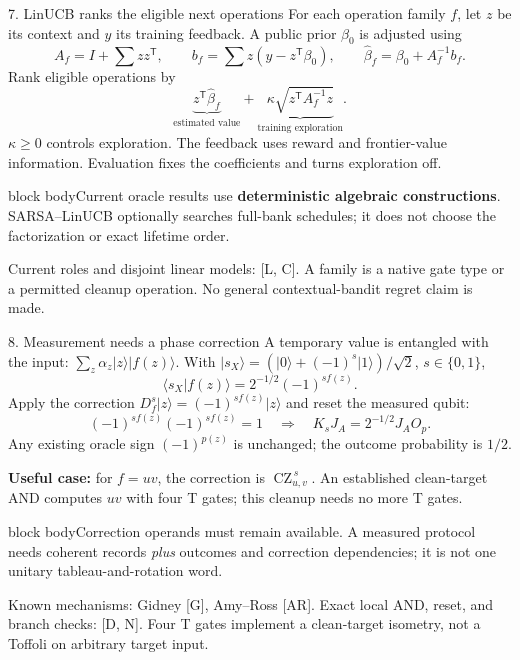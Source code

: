 \documentclass[aspectratio=169,11pt]{beamer}
\newcommand{\partnamebar}{Problem and learned search}
\newcommand{\ket}[1]{\lvert #1\rangle}
\newcommand{\bra}[1]{\langle #1\rvert}
\newcommand{\CZ}{\operatorname{CZ}}
\newcommand{\src}[1]{\par\vfill{\fontsize{6.6}{7.8}\selectfont\color{muted}#1\par}}
\newcommand{\takeaway}[1]{\par\smallskip\begin{beamercolorbox}[sep=1.4mm,wd=\linewidth]{block body}\small #1\end{beamercolorbox}}
\newcommand{\labeltext}[1]{{\color{accent}\bfseries #1}}
\begin{document}
\begin{frame}[t]{7. LinUCB ranks the eligible next operations}
\small
For each operation family $f$, let $z$ be its context and $y$ its training feedback. A public prior $\beta_0$ is adjusted using
\[
 A_f=I+\sum zz^{\mathsf T},\qquad
 b_f=\sum z(y-z^{\mathsf T}\beta_0),\qquad
 \widehat\beta_f=\beta_0+A_f^{-1}b_f.
\]
Rank eligible operations by
\[
 \underbrace{z^{\mathsf T}\widehat\beta_f}_{\text{estimated value}}
 +\underbrace{\kappa\sqrt{z^{\mathsf T}A_f^{-1}z}}_{\text{training exploration}}.
\]
$\kappa\ge0$ controls exploration. The feedback uses reward and frontier-value information. Evaluation fixes the coefficients and turns exploration off.
\takeaway{Current oracle results use \textbf{deterministic algebraic constructions}. SARSA--LinUCB optionally searches full-bank schedules; it does not choose the factorization or exact lifetime order.}
\src{Current roles and disjoint linear models: [L, C]. A family is a native gate type or a permitted cleanup operation. No general contextual-bandit regret claim is made.}
\end{frame}

\renewcommand{\partnamebar}{Measurement, theorem, and construction}
\begin{frame}[t]{8. Measurement needs a phase correction}
\small
A temporary value is entangled with the input: $\sum_z\alpha_z\ket z\ket{f(z)}$.
With $\ket{s_X}=(\ket0+(-1)^s\ket1)/\sqrt2$, $s\in\{0,1\}$,
\[
 \bra{s_X}f(z)\rangle=2^{-1/2}(-1)^{sf(z)}.
\]
Apply the correction $D_f^s\ket z=(-1)^{sf(z)}\ket z$ and reset the measured qubit:
\[
 (-1)^{sf(z)}(-1)^{sf(z)}=1
 \quad\Longrightarrow\quad K_sJ_A=2^{-1/2}J_AO_p.
\]
Any existing oracle sign $(-1)^{p(z)}$ is unchanged; the outcome probability is $1/2$.

\smallskip
\labeltext{Useful case:} for $f=uv$, the correction is $\CZ_{u,v}^{\,s}$. An established clean-target AND computes $uv$ with four T gates; this cleanup needs no more T gates.
\takeaway{Correction operands must remain available. A measured protocol needs coherent records \emph{plus} outcomes and correction dependencies; it is not one unitary tableau-and-rotation word.}
\src{Known mechanisms: Gidney [G], Amy--Ross [AR]. Exact local AND, reset, and branch checks: [D, N]. Four T gates implement a clean-target isometry, not a Toffoli on arbitrary target input.}
\end{frame}
\end{document}
